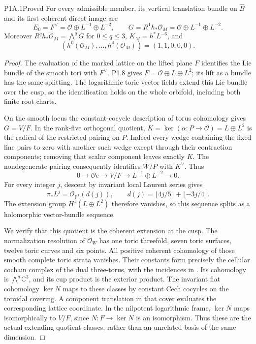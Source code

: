 \begin{statement}{P1A.1}{Proved}
For every admissible member, its vertical translation bundle on
$\widehat B$ and its first coherent direct image are
\[
 E_0=F^\vee=\mathcal O\oplus L^{-1}\oplus L^{-2},\qquad
 G=R^1h_*\mathcal O_M=\mathcal O\oplus L^{-1}\oplus L^{-2}.
\]
Moreover $R^qh_*\mathcal O_M=\bigwedge^qG$ for $0\le q\le3$,
$K_M=h^*L^{-6}$, and
\[
 (h^0(\mathcal O_M),\ldots,h^4(\mathcal O_M))=(1,1,0,0,0).
\]
\end{statement}
\begin{proof}
The evaluation of the marked lattice on the lifted plane $F$
identifies the Lie bundle of the smooth tori with $F^\vee$.
P1.8 gives $F=\mathcal O\oplus L\oplus L^2$; its lift as a bundle
has the same splitting. The logarithmic toric vector fields extend
this Lie bundle over the cusp, so the identification holds on the
whole orbifold, including both finite root charts.

On the smooth locus the constant-cocycle description of torus
cohomology gives $G=V/F$. In the rank-five orthogonal quotient,
$K=\ker(\alpha:P\to\mathcal O)=L\oplus L^2$ is the radical of
the restricted pairing on $P$. Indeed every wedge containing the
fixed line pairs to zero with another such wedge except through
their contraction components; removing that scalar component
leaves exactly $K$. The nondegenerate pairing consequently
identifies $W/P$ with $K^\vee$. Thus
\[
 0\longrightarrow\mathcal O e\longrightarrow V/F
   \longrightarrow L^{-1}\oplus L^{-2}\longrightarrow0.
\]
For every integer $j$, descent by invariant local Laurent series gives
\begin{equation}\label{eq:P1Adegree}
 \pi_*L^j=\mathcal O_{\mathbb P^1}(d(j)),\qquad
 d(j)=\lfloor4j/5\rfloor+\lfloor-3j/4\rfloor.
\end{equation}
The extension group $H^1(L\oplus L^2)$ therefore vanishes, so this
sequence splits as a holomorphic vector-bundle sequence.

We verify that this quotient is the coherent extension at the cusp.
The normalization resolution of $\mathcal O_W$ has one toric
threefold, seven toric surfaces, twelve toric curves and six points.
All positive coherent cohomology of those smooth complete toric
strata vanishes. Their constants form precisely the cellular
cochain complex of the dual three-torus, with the incidences in
. Its cohomology is
$\bigwedge^q\mathbb C^3$, and its cup product is the exterior product.
The invariant flat cohomology $\ker N$ maps to these classes by
constant Cech cocycles on the toroidal covering. A component
translation in that cover evaluates the corresponding lattice
coordinate. In the nilpotent logarithmic frame, $\ker N$ maps
isomorphically to $V/F$, since $N:F\to\ker N$ is an isomorphism.
Thus these are the actual extending quotient classes, rather than
an unrelated basis of the same dimension.


\end{proof}
